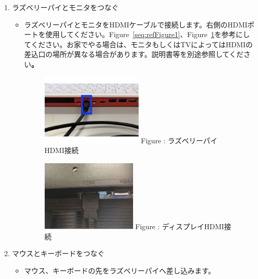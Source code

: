 \documentclass[a4paper,12pt]{jarticle}
\begin{document}
\begin{enumerate}
  \item ラズベリーパイとモニタをつなぐ

        \begin{itemize}
          \item
                ラズベリーパイとモニタをHDMIケーブルで接続します。右側のHDMIポートを使用してください。Figure~\ref{seq:refFigure1}、Figure~\ref{seq:refFigure2}を参考にしてください。お家でやる場合は、モニタもしくはTVによってはHDMIの差込口の場所が異なる場合があります。説明書等を別途参照してください\textbf{。}


                \begin{figure}[h]
                  \begin{minipage}{0.5\textwidth}
                    {\upshape
                      \includegraphics[height=3.471cm]{figure222023.pdf}
                      \newline
                      Figure {\theFigure\label{seq:refFigure1}}:
                      ラズベリーパイHDMI接続}
                  \end{minipage}
                  \begin{minipage}{0.5\textwidth}
                    {\upshape
                      \includegraphics[height=3.471cm]{textbook-img016.png}
                      \newline
                      Figure {\theFigure\label{seq:refFigure2}}:
                      ディスプレイHDMI接続}
                  \end{minipage}
                \end{figure}

        \end{itemize}
  \item マウスとキーボードをつなぐ

        \begin{itemize}
          \item
                マウス、キーボードの先をラズベリーパイへ差し込みます。
        \end{itemize}
\end{enumerate}
\end{document}

